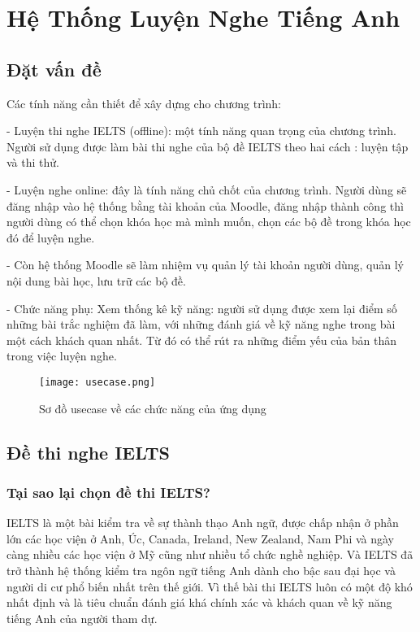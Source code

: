 \chapter{Hệ Thống Luyện Nghe Tiếng Anh }

\ifpdf
    \graphicspath{{Chapter3/Chapter3Figs/PNG/}{Chapter3/Chapter3Figs/PDF/}{Chapter3/Chapter3Figs/}}
\else
    \graphicspath{{Chapter3/Chapter3Figs/EPS/}{Chapter3/Chapter3Figs/}}
\fi

\section{Đặt vấn đề}

Các tính năng cần thiết để xây dựng cho chương trình:

\quad - Luyện thi nghe IELTS (offline): một tính năng quan trọng của chương trình. Người sử dụng được làm bài thi nghe của bộ đề IELTS theo hai cách : luyện tập và thi thử.

\quad -	Luyện nghe online: đây là tính năng chủ chốt của chương trình. Người dùng sẽ đăng nhập vào hệ thống bằng tài khoản của Moodle, đăng nhập thành công thì người dùng có thể chọn khóa học mà mình muốn, chọn các bộ đề trong khóa học đó để luyện nghe.

\quad - Còn hệ thống Moodle sẽ làm nhiệm vụ quản lý tài khoản người dùng, quản lý nội dung bài học, lưu trữ các bộ đề. 

\quad -	Chức năng phụ: Xem thống kê kỹ năng: người sử dụng được xem lại điểm số những bài trắc nghiệm đã làm, với những đánh giá về kỹ năng nghe trong bài một cách khách quan nhất. Từ đó có thể rút ra những điểm yếu của bản thân trong việc luyện nghe.

\begin{figure}[!htb] 
\centering
\texttt{[image: usecase.png]}
\caption{Sơ đồ usecase về các chức năng của ứng dụng}
\end{figure}

\section{Đề thi nghe IELTS}
\subsection{Tại sao lại chọn đề thi IELTS?}

IELTS là một bài kiểm tra về sự thành thạo Anh ngữ, được chấp nhận ở phần lớn các học viện ở Anh, Úc, Canada, Ireland, New Zealand, Nam Phi và ngày càng nhiều các học viện ở Mỹ cũng như nhiều tổ chức nghề nghiệp. Và IELTS đã trở thành hệ thống kiểm tra ngôn ngữ tiếng Anh dành cho bậc sau đại học và người di cư phổ biến nhất trên thế giới. Vì thế bài thi IELTS luôn có một độ khó nhất định và là tiêu chuẩn đánh giá khá chính xác và khách quan về kỹ năng tiếng Anh của người tham dự.


